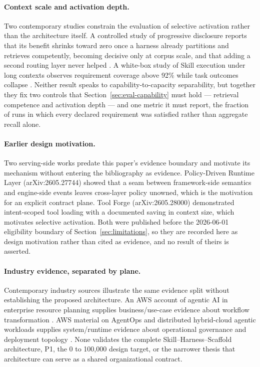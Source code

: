 \paragraph{Context scale and activation depth.}
Two contemporary studies constrain the evaluation of selective activation rather than the architecture itself. A controlled study of progressive disclosure reports that its benefit shrinks toward zero once a harness already partitions and retrieves competently, becoming decisive only at corpus scale, and that adding a second routing layer never helped \cite{he2026disclosure}. A white-box study of Skill execution under long contexts observes requirement coverage above 92\% while task outcomes collapse \cite{xue2026longcontext}. Neither result speaks to capability-to-capacity separability, but together they fix two controls that Section~\ref{sec:eval-capability} must hold --- retrieval competence and activation depth --- and one metric it must report, the fraction of runs in which every declared requirement was satisfied rather than aggregate recall alone.

\paragraph{Earlier design motivation.}
Two serving-side works predate this paper's evidence boundary and motivate its mechanism without entering the bibliography as evidence. Policy-Driven Runtime Layer (arXiv:2605.27744) showed that a seam between framework-side semantics and engine-side events leaves cross-layer policy unowned, which is the motivation for an explicit contract plane. Tool Forge (arXiv:2605.28000) demonstrated intent-scoped tool loading with a documented saving in context size, which motivates selective activation. Both were published before the 2026-06-01 eligibility boundary of Section~\ref{sec:limitations}, so they are recorded here as design motivation rather than cited as evidence, and no result of theirs is asserted.

\paragraph{Industry evidence, separated by plane.}
Contemporary industry sources illustrate the same evidence split without establishing the proposed architecture. An AWS account of agentic AI in enterprise resource planning supplies business/use-case evidence about workflow transformation \cite{aws2026erp}. AWS material on AgentOps and distributed hybrid-cloud agentic workloads supplies system/runtime evidence about operational governance and deployment topology \cite{aws2026agentops,aws2026hybrid}. None validates the complete Skill--Harness--Scaffold architecture, P1, the 0 to 100{,}000 design target, or the narrower thesis that architecture can serve as a shared organizational contract.

